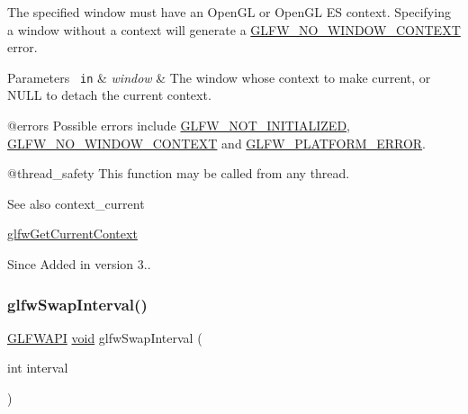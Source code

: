 The specified window must have an Open\+GL or Open\+GL ES context. Specifying a window without a context will generate a \mbox{\hyperlink{group__errors_gacff24d2757da752ae4c80bf452356487}{G\+L\+F\+W\+\_\+\+N\+O\+\_\+\+W\+I\+N\+D\+O\+W\+\_\+\+C\+O\+N\+T\+E\+XT}} error.


\begin{DoxyParams}[1]{Parameters}
\mbox{\texttt{ in}}  & {\em window} & The window whose context to make current, or {\ttfamily N\+U\+LL} to detach the current context.\\
\hline
\end{DoxyParams}
@errors Possible errors include \mbox{\hyperlink{group__errors_ga2374ee02c177f12e1fa76ff3ed15e14a}{G\+L\+F\+W\+\_\+\+N\+O\+T\+\_\+\+I\+N\+I\+T\+I\+A\+L\+I\+Z\+ED}}, \mbox{\hyperlink{group__errors_gacff24d2757da752ae4c80bf452356487}{G\+L\+F\+W\+\_\+\+N\+O\+\_\+\+W\+I\+N\+D\+O\+W\+\_\+\+C\+O\+N\+T\+E\+XT}} and \mbox{\hyperlink{group__errors_gad44162d78100ea5e87cdd38426b8c7a1}{G\+L\+F\+W\+\_\+\+P\+L\+A\+T\+F\+O\+R\+M\+\_\+\+E\+R\+R\+OR}}.

@thread\+\_\+safety This function may be called from any thread.

\begin{DoxySeeAlso}{See also}
context\+\_\+current 

\mbox{\hyperlink{group__context_gac28d98c655377d81a516bf5ef90780c8}{glfw\+Get\+Current\+Context}}
\end{DoxySeeAlso}
\begin{DoxySince}{Since}
Added in version 3.. 
\end{DoxySince}
\mbox{\label{group__context_ga12a595c06947cec4967c6e1f14210a8a}} 
\subsubsection{\texorpdfstring{glfwSwapInterval()}{glfwSwapInterval()}}
{\footnotesize\ttfamily \mbox{\hyperlink{glfw3_8h_a56da5036b2cc259351ae22fd6439bb47}{G\+L\+F\+W\+A\+PI}} \mbox{\hyperlink{glad_8h_a950fc91edb4504f62f1c577bf4727c29}{void}} glfw\+Swap\+Interval (\begin{DoxyParamCaption}\item[{int}]{interval }\end{DoxyParamCaption})}



